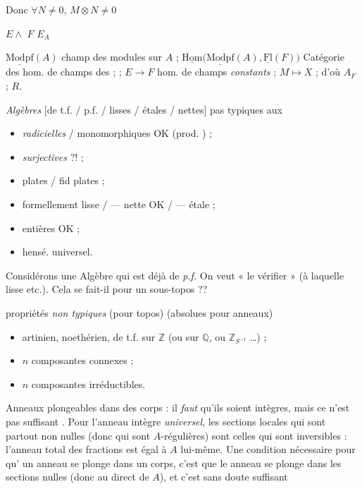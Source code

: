 \documentclass[11pt,a4paper]{article}
\begin{document}



Donc $\forall N \neq 0$, $M \otimes N \neq 0$

$E \wedge$ \quad $F$ \quad $E_{A}$

$\underline{\mathrm{Modpf}}(A)$ champ des modules \ill{} sur $A$ ;
$\underline{\mathrm{Hom}}\bigl(\underline{\mathrm{Modpf}}(A),
\underline{\mathrm{Fl}}(F)\bigr)$ Catégorie des hom. de champs des \ill{} ;
 ; $E \to F$ hom. de champs \emph{constants} ;
$M \mapsto X$ ; d'où $A_{F}$ ; $R$.

\emph{Algèbres} [de t.f. / p.f. / lisses / étales / nettes] pas typiques
\ill{} \ill{} aux \ill{}

\begin{itemize}
  \item \emph{radicielles} / monomorphiques \struck{\ill{}} OK
    (prod. \ill{}) ;
  \item \emph{surjectives} ?! ;
  \item plates  / fid plates ;
  \item formellement lisse / — nette OK / — étale ;
  \item entières OK ;
  \item hensé. universel.
\end{itemize}

Considérons une Algèbre qui est déjà de \emph{p.f.} On veut « le
vérifier » (à laquelle lisse etc.). Cela se fait-il pour un sous-topos ??


propriétés \emph{non typiques} (pour topos) (absolues pour anneaux)
\begin{itemize}
  \item artinien, noethérien, de t.f. sur $\mathbb{Z}$ (ou sur $\mathbb{Q}$,
    \struck{\ill{}} ou $\mathbb{Z}_{S^{-1}}$ …) ;
  \item $n$ composantes connexes ;
  \item $n$ composantes irréductibles.
\end{itemize}

Anneaux plongeables dans des corps : il \emph{faut} qu'ils soient
intègres, mais ce n'est pas suffisant . Pour l'anneau intègre \emph{universel},  les sections locales qui sont partout non
nulles (donc qui sont $A$-régulières) sont celles qui sont inversibles :
l'anneau total des fractions est égal à $A$ lui-même. Une condition
nécessaire pour qu'\struck{\ill{}} un anneau se plonge dans un corps, c'est
que le  \struck{\ill{}} anneau se plonge dans les sections
nulles (donc \ill{} au \ill{} \ill{} direct de $A$), et c'est sans doute
suffisant
\end{document}
